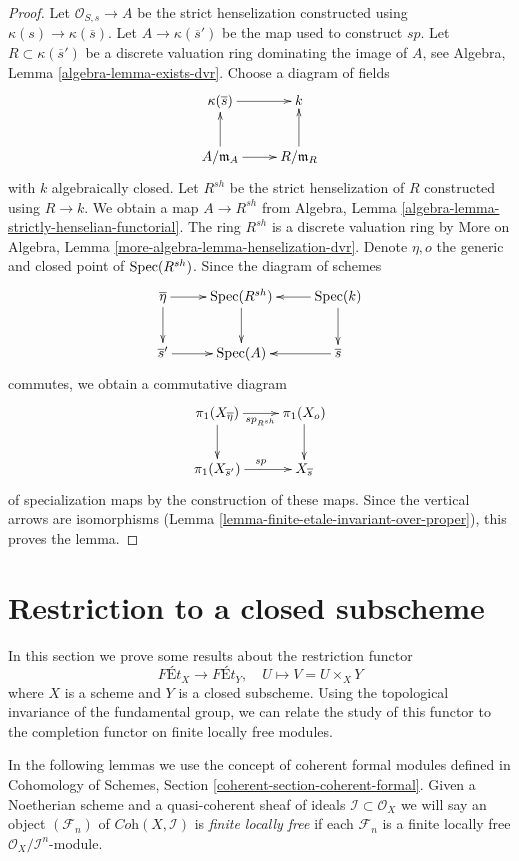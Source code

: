 \begin{proof}
Let $\mathcal{O}_{S, s} \to A$ be the strict henselization
constructed using $\kappa(s) \to \kappa(\overline{s})$.
Let $A \to \kappa(\overline{s}')$ be the map used to construct $sp$.
Let $R \subset \kappa(\overline{s}')$ be a discrete valuation ring
dominating the image of $A$, see Algebra, Lemma \ref{algebra-lemma-exists-dvr}.
Choose a diagram of fields
$$
\xymatrix{
\kappa(\overline{s}) \ar[r] & k \\
A/\mathfrak m_A \ar[r] \ar[u] & R/\mathfrak m_R \ar[u]
}
$$
with $k$ algebraically closed. Let $R^{sh}$ be the strict
henselization of $R$ constructed using $R \to k$. We obtain
a map $A \to R^{sh}$ from Algebra, Lemma
\ref{algebra-lemma-strictly-henselian-functorial}.
The ring $R^{sh}$ is a discrete valuation ring by
More on Algebra, Lemma \ref{more-algebra-lemma-henselization-dvr}.
Denote $\eta, o$ the generic and closed point of $\mathop{\mathrm{Spec}}(R^{sh})$.
Since the diagram of schemes
$$
\xymatrix{
\overline{\eta} \ar[d] \ar[r] & \Spec(R^{sh}) \ar[d] &
\Spec(k) \ar[d] \ar[l] \\
\overline{s}' \ar[r] & \Spec(A) & \overline{s} \ar[l]
}
$$
commutes, we obtain a commutative diagram
$$
\xymatrix{
\pi_1(X_{\overline{\eta}}) \ar[d] \ar[r]_{sp_{R^{sh}}} & \pi_1(X_o) \ar[d] \\
\pi_1(X_{\overline{s}'}) \ar[r]^{sp} & X_{\overline{s}}
}
$$
of specialization maps by the construction of these maps.
Since the vertical arrows are isomorphisms
(Lemma \ref{lemma-finite-etale-invariant-over-proper}), this proves the lemma.
\end{proof}








\section{Restriction to a closed subscheme}
\label{section-lefschetz}

\noindent
In this section we prove some results about the restriction functor
$$
\textit{F\'Et}_X \longrightarrow \textit{F\'Et}_Y,\quad
U \longmapsto V = U \times_X Y
$$
where $X$ is a scheme and $Y$ is a closed subscheme. Using the
topological invariance of the fundamental group, we can relate
the study of this functor to the completion functor on
finite locally free modules.

\medskip\noindent
In the following lemmas we use the concept of coherent formal modules
defined in
Cohomology of Schemes, Section \ref{coherent-section-coherent-formal}.
Given a Noetherian scheme and a quasi-coherent sheaf of ideals
$\mathcal{I} \subset \mathcal{O}_X$ we will say
an object $(\mathcal{F}_n)$ of $\textit{Coh}(X, \mathcal{I})$
is {\it finite locally free} if each $\mathcal{F}_n$ is a finite
locally free $\mathcal{O}_X/\mathcal{I}^n$-module.


